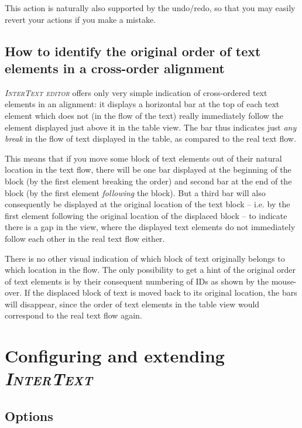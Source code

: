 \documentclass[a4paper,10pt,oneside]{book}
\newcommand{\IT}{\textit{\textsc{InterText}}\xspace}
\newcommand{\ITeditor}{\textit{\textsc{InterText editor}}\xspace}
\begin{document}
This action is naturally also supported by the undo/redo, so that you may easily revert your actions if you make a mistake.

\section[How to identify the original order]{How to identify the original order of text elements in a cross-order alignment}\label{ch:detail:crossorder:visualization}

\ITeditor offers only very simple indication of cross-ordered text elements in an alignment: it displays a horizontal bar at the top of each text element which does not (in the flow of the text) really immediately follow the element displayed just above it in the table view. The bar thus indicates just \emph{any break} in the flow of text displayed in the table, as compared to the real text flow.

This means that if you move some block of text elements out of their natural location in the text flow, there will be one bar displayed at the beginning of the block (by the first element breaking the order) and second bar at the end of the block (by the first element \emph{following} the block). But a third bar will also consequently be displayed at the original location of the text block -- i.e. by the first element following the original location of the displaced block -- to indicate there is a gap in the view, where the displayed text elements do not immediately follow each other in the real text flow either.

There is no other visual indication of which block of text originally belongs to which location in the flow. The only possibility to get a hint of the original order of text elements is by their consequent numbering of IDs as shown by the mouse-over. If the displaced block of text is moved back to its original location, the bars will disappear, since the order of text elements in the table view would correspond to the real text flow again.

\chapter{Configuring and extending \IT}\label{ch:detail:config}

\section{Options}\label{ch:detail:config:options}
\end{document}
